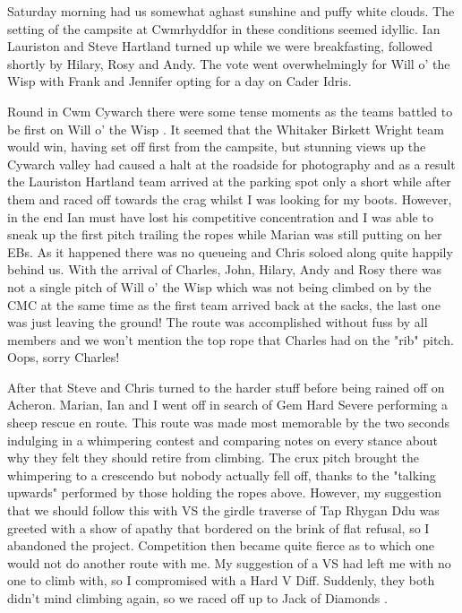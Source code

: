 \documentclass[a5paper,openany,font 10pt]{scrbook}
\begin{document}
Saturday morning had us somewhat aghast   sunshine and puffy
white clouds. The setting of the campsite at Cwmrhyddfor in these
conditions seemed idyllic. Ian Lauriston and Steve Hartland
turned up while we were breakfasting, followed shortly by Hilary,
Rosy and Andy. The vote went overwhelmingly for  Will o' the Wisp
with Frank and Jennifer opting for a day on Cader Idris.

Round in Cwm Cywarch there were some tense moments as the
teams battled to be first on  Will o' the Wisp . It seemed that the
Whitaker Birkett Wright team would win, having set off first from
the campsite, but stunning views up the Cywarch valley had caused
a halt at the roadside  for photography and as a result the
Lauriston Hartland team arrived at the parking spot only a short
while after them and raced off towards the crag whilst I was
looking for my boots. However, in the end Ian must have lost his
competitive concentration and I was able to sneak up the first
pitch trailing the ropes while Marian was still putting on her
EBs. As it happened there was no queueing and Chris soloed along
quite happily behind us. With the arrival of Charles, John,
Hilary, Andy and Rosy there was not a single pitch of  Will o' the
Wisp  which was not being climbed on by the CMC at the same time
as the first team arrived back at the sacks, the last one was
just leaving the ground! The route was accomplished without fuss
by all members and we won't mention the top rope that Charles had
on the "rib" pitch. Oops, sorry Charles!

After that Steve and Chris turned to the harder stuff before
being rained off on  Acheron. Marian, Ian and I went off in search
of  Gem   Hard Severe  performing a sheep rescue en route. This
route was made most memorable by the two seconds indulging in a
whimpering contest and comparing notes on every stance about why
they felt they should retire from climbing. The crux pitch
brought the whimpering to a crescendo but nobody actually fell
off, thanks to the "talking upwards" performed by those holding
the ropes above. However, my suggestion that we should follow
this with VS the girdle traverse of Tap Rhygan Ddu was greeted
with a show of apathy that bordered on the brink of flat refusal,
so I abandoned the project. Competition then became quite fierce
as to which one would  not  do another route with me. My suggestion
of a VS had left me with no one to climb with, so I compromised
with a Hard V Diff. Suddenly, they both didn't mind climbing
again, so we raced off up to  Jack of Diamonds .
\end{document}
